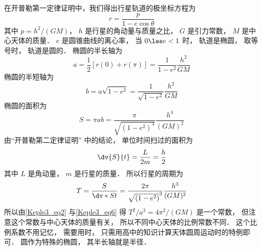 

在开普勒第一定律证明中，我们得出行星轨道的极坐标方程为
\begin{equation}\label{Keple3_eq1}
  r = \frac{p}{1 - e \cos \theta }
\end{equation}
其中 $p = h^2/(GM)$，  $h$ 是行星的角动量与质量之比， $G$ 是引力常数， $M$ 是中心天体的质量． $e$ 是圆锥曲线的离心率， 当 $0 \les e < 1$ 时， 轨道是椭圆， 取等号时， 轨道是圆的． 椭圆的半长轴为
\begin{equation}\label{Keple3_eq2}
a = \frac12 [r(0) + r(\pi)] = \frac{1}{1 - e^2}\frac{h^2}{GM}
\end{equation}
椭圆的半短轴为
\begin{equation}\label{Keple3_eq3}
b = a\sqrt {1 - e^2}  = \frac{1}{\sqrt {1 - e^2}}\frac{h^2}{GM}
\end{equation}
椭圆的面积为
\begin{equation}\label{Keple3_eq4}
S = \pi ab = \frac{\pi }{\sqrt{(1 - e^2)^3} }\frac{h^4}{(GM)^2}
\end{equation}
由“开普勒第二定律证明” 中的结论， 单位时间扫过的面积为
\begin{equation}\label{Keple3_eq5}
\dv{S}{t} = \frac{L}{2m} = \frac{h}{2}
\end{equation}
其中 $L$ 是角动量， $m$ 是行星的质量． 所以行星的周期为
\begin{equation}\label{Keple3_eq6}
  T = \frac{S}{\dv*{S}{t}} = \frac{2\pi}{\sqrt{(1 - e^2)}^3}\frac{h^3}{(GM)^2}
\end{equation}
所以由\autoref{Keple3_eq2} 与\autoref{Keple3_eq6} 得 $T^2/a^3 = 4\pi ^2/(GM)$ 是一个常数， 但注意这个常数与中心天体的质量有关， 所以不同中心天体的比例常数不同． 这个比例系数不用记忆， 需要用时， 只需用高中的知识计算天体圆周运动时的特例即可． 圆作为特殊的椭圆， 其半长轴就是半径．
